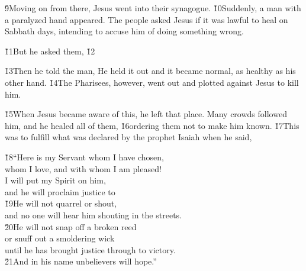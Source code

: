 \v{9}Moving on from there, Jesus went into their synagogue. \v{10}Suddenly, a man with a paralyzed hand appeared. The people asked Jesus if it was lawful to heal on Sabbath days, intending to accuse him of doing something wrong.

\v{11}But he asked them,  \v{12}

\v{13}Then he told the man,  He held it out and it became normal, as healthy as his other hand. \v{14}The Pharisees, however, went out and plotted against Jesus to kill him.

\v{15}When Jesus became aware of this, he left that place. Many crowds followed him, and he healed all of them, \v{16}ordering them not to make him known. \v{17}This was to fulfill what was declared by the prophet Isaiah when he said,

\begin{poetry}
\poeml \v{18}``Here is my Servant whom I have chosen, \\
\poemll    whom I love, and with whom I am pleased! \\
\poeml I will put my Spirit on him, \\
\poemll    and he will proclaim justice to  \\
\poeml \v{19}He will not quarrel or shout, \\
\poemll    and no one will hear him shouting in the streets. \\
\poeml \v{20}He will not snap off a broken reed \\
\poemll    or snuff out a smoldering wick \\
\poemlll       until he has brought justice through to victory. \\
\poeml \v{21}And in his name unbelievers will hope.''
\end{poetry}

